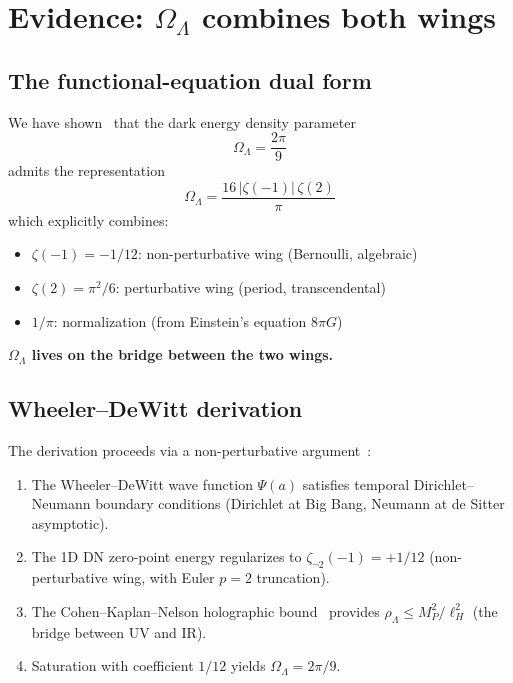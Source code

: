 \documentclass[11pt,a4paper]{article}
\begin{document}
\section{Evidence: $\Omega_\Lambda$ combines both wings}

\subsection{The functional-equation dual form}

We have shown~\cite{wb-wdw} that the dark energy density parameter
\begin{equation}
\Omega_\Lambda = \frac{2\pi}{9}
\end{equation}
admits the representation
\begin{equation}\label{eq:omega-dual}
\Omega_\Lambda = \frac{16\,|\zeta(-1)|\,\zeta(2)}{\pi}
\end{equation}
which explicitly combines:
\begin{itemize}
\item $\zeta(-1) = -1/12$: non-perturbative wing (Bernoulli,
algebraic)
\item $\zeta(2) = \pi^2/6$: perturbative wing (period,
transcendental)
\item $1/\pi$: normalization (from Einstein's equation $8\pi G$)
\end{itemize}

\textbf{$\Omega_\Lambda$ lives on the bridge between the two
wings.}

\subsection{Wheeler--DeWitt derivation}

The derivation proceeds via a non-perturbative argument~\cite{wb-wdw}:

\begin{enumerate}
\item The Wheeler--DeWitt wave function $\Psi(a)$ satisfies temporal
Dirichlet--Neumann boundary conditions (Dirichlet at Big Bang,
Neumann at de Sitter asymptotic).
\item The 1D DN zero-point energy regularizes to
$\zeta_{\neg 2}(-1) = +1/12$ (non-perturbative wing, with Euler
$p = 2$ truncation).
\item The Cohen--Kaplan--Nelson holographic bound~\cite{CKN1999}
provides $\rho_\Lambda \leq M_P^2/\ell_H^2$ (the bridge between
UV and IR).
\item Saturation with coefficient $1/12$ yields
$\Omega_\Lambda = 2\pi/9$.
\end{enumerate}
\end{document}
